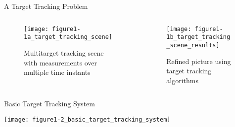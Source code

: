 \documentclass[aspectratio=1610]{beamer}
\begin{document}
%
%

\begin{frame}{A Target Tracking Problem}

\begin{columns}

\begin{column}{.45\textwidth}
    \vspace{-3em}
    \begin{figure}
        \centering
        \texttt{[image: figure1-1a\_target\_tracking\_scene]}
        \caption*{Multitarget tracking scene with measurements over multiple time instants}
    \end{figure}
\end{column}

\pause

\begin{column}{.45\textwidth}
    \begin{figure}
        \centering
        \texttt{[image: figure1-1b\_target\_tracking\_scene\_results]}
        \caption*{Refined picture using target tracking algorithms}
    \end{figure}
\end{column}

\end{columns}

\end{frame}


\begin{frame}{Basic Target Tracking System}

\begin{center}
    \texttt{[image: figure1-2\_basic\_target\_tracking\_system]}
\end{center}

\end{frame}
\end{document}
